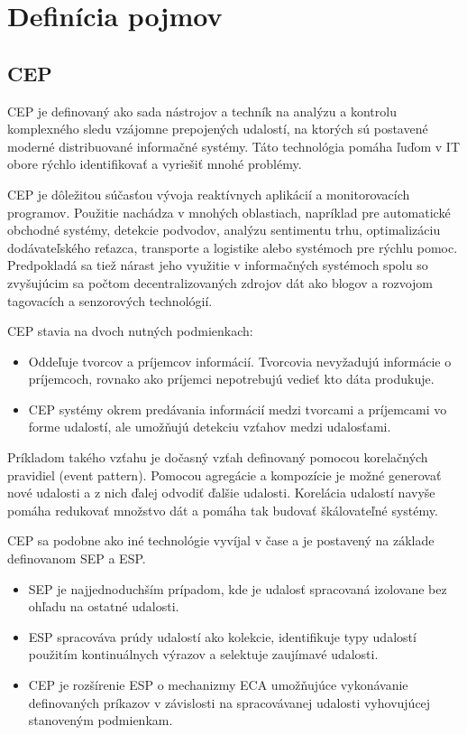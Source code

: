 \chapter{Definícia pojmov}
\label{chap:pojmy}

\section{CEP}
	\ac{CEP} je definovaný ako sada nástrojov a techník na analýzu a kontrolu komplexného sledu vzájomne prepojených udalostí, na ktorých sú postavené moderné distribuované informačné systémy. Táto technológia pomáha ľuďom v IT obore rýchlo identifikovať a vyriešiť mnohé problémy. \cite{power-of-events}

	\ac{CEP} je dôležitou súčasťou vývoja reaktívnych aplikácií a monitorovacích programov. Použitie nachádza v mnohých oblastiach, napríklad pre automatické obchodné systémy, detekcie podvodov, analýzu sentimentu trhu, optimalizáciu dodávateľského reťazca, transporte a logistike alebo systémoch pre rýchlu pomoc. Predpokladá sa tiež nárast jeho využitie v informačných systémoch spolu so zvyšujúcim sa počtom decentralizovaných zdrojov dát ako blogov a rozvojom tagovacích a senzorových technológií.

	\ac{CEP} stavia na dvoch nutných podmienkach: \cite{web:cep-editorial}
	\begin{itemize}
		\item Oddeľuje tvorcov a príjemcov informácií. Tvorcovia nevyžadujú informácie o príjemcoch, rovnako ako príjemci nepotrebujú vedieť kto dáta produkuje.
		\item CEP systémy okrem predávania informácií medzi tvorcami a príjemcami vo forme udalostí, ale umožňujú detekciu vzťahov medzi udalosťami.
	\end{itemize}
	
	Príkladom takého vzťahu je dočasný vzťah definovaný pomocou korelačných pravidiel (event pattern). Pomocou agregácie a kompozície je možné generovať nové udalosti a z nich ďalej odvodiť ďalšie udalosti. Korelácia udalostí navyše pomáha redukovať množstvo dát a pomáha tak budovať škálovateľné systémy.
	
	\ac{CEP} sa podobne ako iné technológie vyvíjal v čase a je postavený na základe definovanom \ac{SEP} a \ac{ESP}.
	\begin{itemize}
		\item SEP je najjednoduchším prípadom, kde je udalosť spracovaná izolovane bez ohľadu na ostatné udalosti.
		\item ESP spracováva prúdy udalostí ako kolekcie, identifikuje typy udalostí použitím kontinuálnych výrazov a selektuje zaujímavé udalosti.
		\item CEP je rozšírenie ESP o mechanizmy \ac{ECA} umožňujúce vykonávanie definovaných príkazov v závislosti na spracovávanej udalosti vyhovujúcej stanoveným podmienkam.
	\end{itemize}
	
